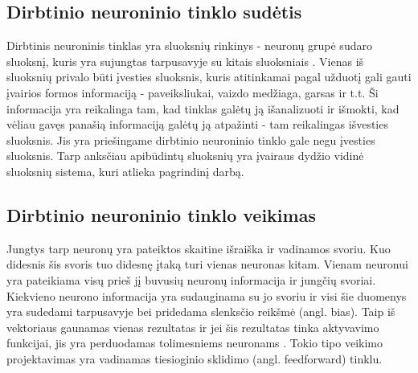 \documentclass{VUMIFPSbakalaurinis}
\begin{document}
\subsection{Dirbtinio neuroninio tinklo sudėtis}
Dirbtinis neuroninis tinklas yra sluoksnių rinkinys - neuronų grupė sudaro sluoksnį, kuris yra sujungtas tarpusavyje su kitais sluoksniais \cite{1193152}. Vienas iš
sluoksnių privalo būti įvesties sluoksnis, kuris atitinkamai pagal užduotį gali gauti įvairios formos informaciją - paveiksliukai, vaizdo
medžiaga, garsas ir t.t. Ši informacija yra reikalinga tam, kad tinklas galėtų ją išanalizuoti ir išmokti, kad vėliau gavęs panašią
informaciją galėtų ją atpažinti - tam reikalingas išvesties sluoksnis. Jis yra priešingame dirbtinio neuroninio tinklo gale negu įvesties sluoksnis.
Tarp anksčiau apibūdintų sluoksnių yra įvairaus dydžio vidinė sluoksnių sistema, kuri atlieka pagrindinį darbą.

\subsection{Dirbtinio neuroninio tinklo veikimas}
Jungtys tarp neuronų yra pateiktos skaitine išraiška ir vadinamos svoriu. Kuo didesnis šis svoris tuo didesnę įtaką turi vienas neuronas kitam.
Vienam neuronui yra pateikiama visų prieš jį buvusių neuronų informacija ir jungčių svoriai. Kiekvieno neurono informacija yra sudauginama su
jo svoriu ir visi šie duomenys yra sudedami tarpusavyje bei pridedama slenksčio reikšmė (angl. bias). Taip iš vektoriaus gaunamas vienas rezultatas ir jei šis rezultatas tinka aktyvavimo
funkcijai, jis yra perduodamas tolimesniems neuronams \cite{shiffman2012nature}. Tokio tipo veikimo projektavimas yra vadinamas tiesioginio sklidimo (angl. feedforward) tinklu.
\end{document}
